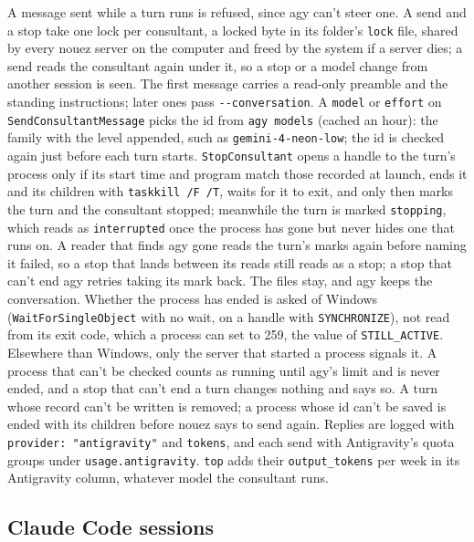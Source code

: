 \documentclass[10pt,a4paper]{article}
\newcommand{\code}[1]{\texttt{#1}}
\begin{document}
A message sent while a turn runs is refused, since agy can't steer one. A send and a stop take
one lock per consultant, a locked byte in its folder's \code{lock} file, shared by every nouez
server on the computer and freed by the system if a server dies; a send reads the consultant again
under it, so a stop or a model change from another session is seen. The first message carries
a read-only preamble and the standing instructions; later ones pass \code{-{}-conversation}. A
\code{model} or \code{effort} on \code{SendConsultantMessage} picks the id from
\code{agy models} (cached an hour): the family with the level appended, such as
\code{gemini-4-neon-low}; the id is checked again just before each turn starts.
\code{StopConsultant} opens a handle to the turn's process only if its start time and program
match those recorded at launch, ends it and its children with \code{taskkill /F /T}, waits for it to
exit, and only then marks the turn and the consultant stopped; meanwhile the turn is marked
\code{stopping}, which reads as \code{interrupted} once the process has gone but never hides one
that runs on. A reader that finds agy gone reads the turn's marks again before naming it failed,
so a stop that lands between its reads still reads as a stop; a stop that can't end agy retries
taking its mark back. The files stay, and agy keeps the conversation. Whether the process has
ended is asked of Windows (\code{WaitForSingleObject} with no wait, on a handle with
\code{SYNCHRONIZE}), not read from its exit code, which a process can set to 259, the value of
\code{STILL\_ACTIVE}. Elsewhere than Windows, only the server that started a process signals it. A process
that can't be checked counts as running until agy's limit and is never ended, and a stop that can't
end a turn changes nothing and says so. A turn whose record can't be written is removed; a process
whose id can't be saved is ended with its children before nouez says to send again. Replies are logged with \code{provider: "antigravity"} and \code{tokens}, and each
send with Antigravity's quota groups under \code{usage.antigravity}. \code{top} adds their
\code{output\_tokens} per week in its Antigravity column, whatever model the consultant runs.

\subsection{Claude Code sessions}
\label{sec:claude-tools}
\end{document}
